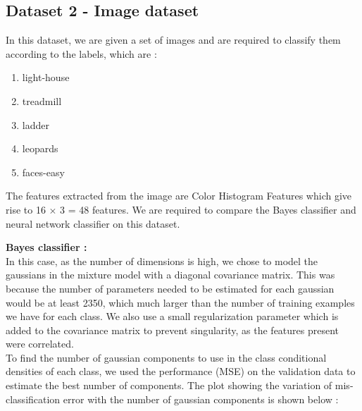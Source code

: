 \documentclass{article}
\begin{document}
\newpage

\subsection{Dataset 2 - Image dataset}
In this dataset, we are given a set of images and are required to classify them according to the labels, which are  :


\begin{enumerate}

\item    light-house

\item    treadmill

\item    ladder

\item    leopards

\item    faces-easy


\end{enumerate}

The features extracted from the image are Color Histogram Features which give rise to 16 $\times$ 3 = 48 features.  We are required to compare the Bayes classifier and neural network classifier on this dataset.


\begin{flushleft}

\textbf{Bayes classifier :} \\[10pt]

In this case, as the number of dimensions is high, we chose to model the gaussians in the  mixture model with a diagonal covariance matrix. This was because the number of parameters needed to be estimated for each gaussian would be at least 2350, which much larger than the number of training examples we have for each class. We also use a small regularization parameter which is added to the covariance matrix to prevent singularity, as the features present were correlated. \\[10pt]


To find the number of gaussian components to use in the class conditional densities of each class, we used the performance (MSE) on the validation data to estimate the best number of components. The plot showing the variation of mis-classification error with the number of gaussian components is shown below :

\end{flushleft}
\end{document}
